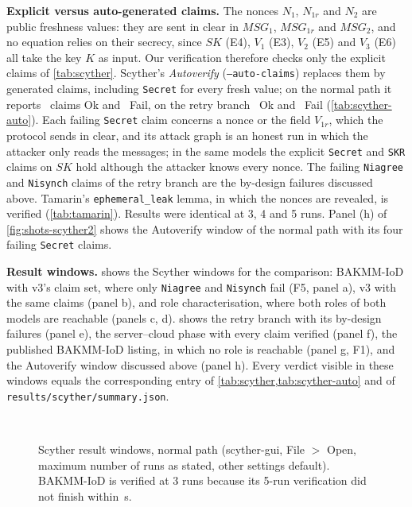 \textbf{Explicit versus auto-generated claims.} The nonces $N_1$, $N_{1r}$ and $N_2$ are public freshness values: they are
sent in clear in $MSG_1$, $MSG_{1r}$ and $MSG_2$, and no equation relies on their secrecy, since $SK$ (E4), $V_1$ (E3), $V_2$ (E5)
and $V_3$ (E6) all take the key $K$ as input. Our verification therefore checks only the explicit claims of
\cref{tab:scyther}. Scyther's \emph{Autoverify} (\texttt{--auto-claims}) replaces them by generated claims, including
\texttt{Secret} for every fresh value; on the normal path it reports \ScyAutoNormalAutoOk\ claims Ok and
\ScyAutoNormalAutoFail\ Fail, on the retry branch \ScyAutoRetryAutoOk\ Ok and \ScyAutoRetryAutoFail\ Fail
(\cref{tab:scyther-auto}). Each failing \texttt{Secret} claim concerns a nonce or the field $V_{1r}$, which the protocol sends
in clear, and its attack graph is an honest run in which the attacker only reads the messages; in the same models the explicit
\texttt{Secret} and \texttt{SKR} claims on $SK$ hold although the attacker knows every nonce. The failing \texttt{Niagree} and
\texttt{Nisynch} claims of the retry branch are the by-design failures discussed above. Tamarin's \texttt{ephemeral\_leak}
lemma, in which the nonces are revealed, is verified (\cref{tab:tamarin}). Results were identical at 3, 4 and 5 runs.
Panel (h) of \cref{fig:shots-scyther2} shows the Autoverify window of the normal path with its four failing \texttt{Secret}
claims.


\textbf{Result windows.}  shows the Scyther windows for the comparison: BAKMM-IoD with v3's claim set,
where only \texttt{Niagree} and \texttt{Nisynch} fail (F5, panel a), v3 with the same claims (panel b), and role
characterisation, where both roles of both models are reachable (panels c, d).  shows the retry branch
with its by-design failures (panel e), the server--cloud phase with every claim verified (panel f), the published BAKMM-IoD
listing, in which no role is reachable (panel g, F1), and the Autoverify window discussed above (panel h). Every verdict
visible in these windows equals the corresponding entry of \cref{tab:scyther,tab:scyther-auto} and of
\texttt{results/scyther/summary.json}.

\begin{figure}[!htbp]
\centering
{}\hfill
{}\\[4pt]
\hfill
{}
\caption{Scyther result windows, normal path (scyther-gui, File $>$ Open, maximum number of runs as stated, other settings
default). BAKMM-IoD is verified at 3 runs because its 5-run verification did not finish within \ScyBakmmFiveSecs\,s.}
\label{fig:shots-scyther}
\end{figure}

